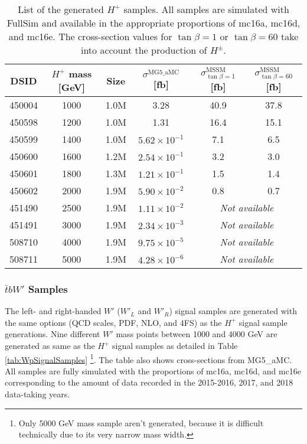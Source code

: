 \begin{table}[H]
  \centering
  \begin{tabular*}{160mm}{@{\extracolsep{\fill}}cccccc}
    \hline\hline
    DSID   & $H^{+}$ mass [GeV] & Size & ${\sigma}^{\text{MG5\_aMC}}$ [fb] & ${\sigma}_{\tan{\beta}=1}^{\text{MSSM}}$ [fb] & ${\sigma}_{\tan{\beta}=60}^{\text{MSSM}}$ [fb]\\
    \hline
    450004 & 1000 & 1.0M & 3.28                  & 40.9 & 37.8\\
    450598 & 1200 & 1.0M & 1.31                  & 16.4 & 15.1\\
    450599 & 1400 & 1.0M & $5.62{\times}10^{-1}$ &  7.1 &  6.5\\
    450600 & 1600 & 1.2M & $2.54{\times}10^{-1}$ &  3.2 &  3.0\\
    450601 & 1800 & 1.3M & $1.21{\times}10^{-1}$ &  1.5 &  1.4\\
    450602 & 2000 & 1.9M & $5.90{\times}10^{-2}$ &  0.8 &  0.7\\
    451490 & 2500 & 1.9M & $1.11{\times}10^{-2}$ & \multicolumn{2}{c}{\textit{Not available}}\\
    451491 & 3000 & 1.9M & $2.34{\times}10^{-3}$ & \multicolumn{2}{c}{\textit{Not available}}\\     
    508710 & 4000 & 1.9M & $9.75{\times}10^{-5}$ & \multicolumn{2}{c}{\textit{Not available}}\\     
    508711 & 5000 & 1.9M & $4.28{\times}10^{-6}$ & \multicolumn{2}{c}{\textit{Not available}}\\     
    \hline\hline
  \end{tabular*}
  \caption{List of the generated $H^{+}$ samples. All samples are simulated with FullSim and available in the appropriate proportions of mc16a, mc16d, and mc16e. The cross-section values for $\tan{\beta}=1$ or $\tan{\beta}=60$ take into account the production of $H^{\pm}$.}
  \label{tab:HpSignalSamples}
\end{table}

\subsubsection{$\bar{t}bW'$ Samples}
\label{subsec:WpSample}
The left- and right-handed $W'$ ($W'_{L}$ and $W'_{R}$) signal samples are generated with the same options (QCD scales, PDF, NLO, and 4FS) as the $H^{+}$ signal sample generations. Nine different $W'$ mass points between 1000 and 4000 GeV are generated as same as the $H^{+}$ signal samples as detailed in Table \ref{tab:WpSignalSamples} \footnote{Only 5000 GeV mass sample aren't generated, because it is difficult technically due to its very narrow mass width.}. The table also shows cross-sections from MG5\_aMC. All samples are fully simulated with the proportions of mc16a, mc16d, and mc16e corresponding to the amount of data recorded in the 2015-2016, 2017, and 2018 data-taking years. 

